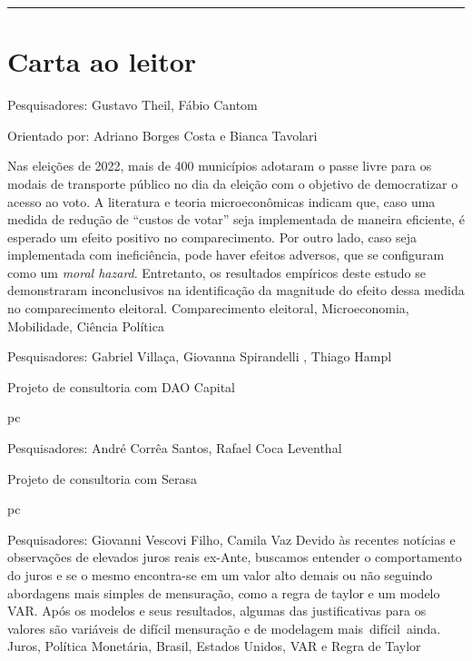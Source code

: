 \documentclass[
    10pt, 
    a4paper, 
    ]{article}
\begin{document}


\tableofcontents


\bigskip\bigskip

\noindent\rule{\linewidth}{.5pt}

\section*{Carta ao leitor}

    {
        \noindent Pesquisadores: Gustavo Theil, Fábio Cantom

        \noindent Orientado por: Adriano Borges Costa e Bianca Tavolari
    }
    {
        Nas eleições de 2022, mais de 400 municípios adotaram o passe livre para os modais de transporte público no dia da eleição com o objetivo de democratizar o acesso ao voto. A literatura e teoria microeconômicas indicam que, caso uma medida de redução de ``custos de votar'' seja implementada de maneira eficiente, é esperado um efeito positivo no comparecimento. Por outro lado, caso seja implementada com ineficiência, pode haver efeitos adversos, que se configuram como um \textit{moral hazard}. Entretanto, os resultados empíricos deste estudo se demonstraram inconclusivos na identificação da magnitude do efeito dessa medida no comparecimento eleitoral. 
    }
    {Comparecimento eleitoral, Microeconomia, Mobilidade, Ciência Política}




    {
        \noindent Pesquisadores: Gabriel Villaça, Giovanna Spirandelli , Thiago Hampl

        \noindent Projeto de consultoria com DAO Capital
    }
    {\lipsum[1-1]}
    {pc}



    {
        \noindent Pesquisadores: André Corrêa Santos, Rafael Coca Leventhal

        \noindent Projeto de consultoria com Serasa
    }
    {\lipsum[1-1]}
    {pc}



    {\noindent Pesquisadores: Giovanni Vescovi Filho, Camila Vaz}
    {Devido às recentes notícias e observações de elevados juros reais ex-Ante, buscamos entender o comportamento do juros e se o mesmo encontra-se em um valor alto demais ou não seguindo abordagens mais simples de mensuração, como a regra de taylor e um modelo VAR. Após os modelos e seus resultados, algumas das justificativas para os valores são variáveis de difícil mensuração e de modelagem mais difícil ainda.}
    {Juros, Política Monetária, Brasil, Estados Unidos, VAR e Regra de Taylor
    }
\end{document}
